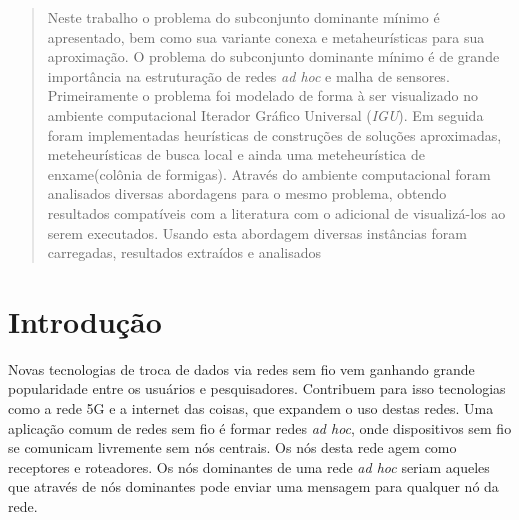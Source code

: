 \documentclass[conference,compsoc]{IEEEtran}
\begin{document}




\maketitle

\begin{abstract}
Neste trabalho o problema do subconjunto dominante mínimo é apresentado, bem como sua variante conexa e metaheurísticas para sua aproximação. O problema do subconjunto dominante mínimo é de grande importância na estruturação de redes \textit{ad hoc} e malha de sensores. Primeiramente o problema foi modelado de forma à ser visualizado no ambiente computacional Iterador Gráfico Universal (\textit{IGU}). Em seguida foram implementadas heurísticas de construções de soluções aproximadas, meteheurísticas de busca local e ainda uma meteheurística de enxame(colônia de formigas). Através do ambiente computacional foram analisados diversas abordagens para o mesmo problema, obtendo resultados compatíveis com a literatura com o adicional de visualizá-los ao serem executados. Usando esta abordagem diversas instâncias foram carregadas, resultados extraídos e analisados
\end{abstract}





%
\IEEEpeerreviewmaketitle



\section{Introdução}
Novas tecnologias de troca de dados via redes sem fio vem ganhando grande popularidade entre os usuários e pesquisadores. Contribuem para isso tecnologias como a rede 5G e a internet das coisas, que expandem o uso destas redes. Uma aplicação comum de redes sem fio é formar redes \textit{ad hoc}, onde dispositivos sem fio se comunicam livremente sem nós centrais. Os nós desta rede agem como receptores e roteadores. Os nós dominantes de uma rede \textit{ad hoc} seriam aqueles que através de nós dominantes pode enviar uma mensagem para qualquer nó da rede.
\end{document}
